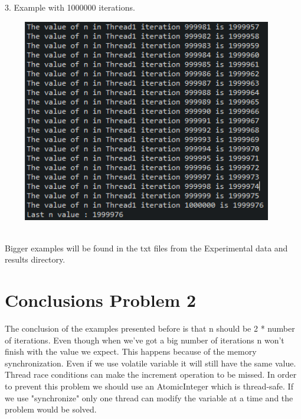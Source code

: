 \documentclass[14pt]{article}
\begin{document}
\begin{center}
3. Example with 1000000 iterations.
\vspace{10mm}

\includegraphics[height=3.5in, width = 5in]{problem21000.png}\\
\end{center}\\
Bigger examples will be found in the txt files from the Experimental data and results directory.
\newpage


\section*{Conclusions Problem 2}
\vspace{10 mm}
The conclusion of the examples presented before is that n should be 2 * number of iterations. Even though when we've got a big number of iterations n won't finish with the value we expect. This happens because of the memory synchronization. Even if we use volatile variable it will still have the same value. Thread race conditions can make the increment operation to be missed. In order to prevent this problem we should use an AtomicInteger which is thread-safe. If we use "synchronize" only one thread can modify the variable at a time and the problem would be solved.

\newpage
\end{document}
